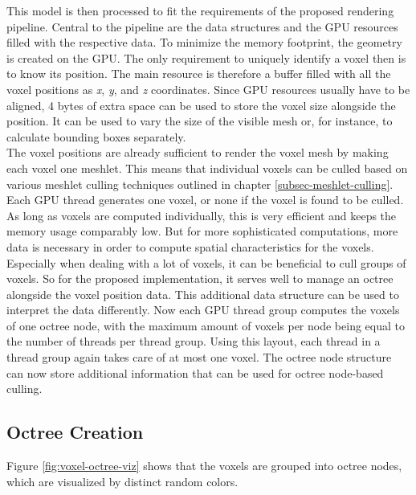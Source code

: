\noindent
This model is then processed to fit the requirements of the proposed rendering pipeline. Central to the pipeline 
are the data structures and the \ac{GPU} resources filled with the respective data. To minimize the memory footprint,
the geometry is created on the \ac{GPU}. The only requirement to uniquely identify a voxel then is to know its position.
The main resource is therefore a buffer filled with all the voxel positions as \emph{x}, \emph{y}, and \emph{z} coordinates. 
Since \ac{GPU} resources usually have to be aligned, 4 bytes of extra space can be used to store the voxel size 
alongside the position. It can be used to vary the size of the visible mesh or, for instance, to calculate bounding 
boxes separately. \\

\noindent
The voxel positions are already sufficient to render the voxel mesh by making each voxel one meshlet. This means that 
individual voxels can be culled based on various meshlet culling techniques outlined in chapter 
\ref{subsec-meshlet-culling}. Each \ac{GPU} thread generates one voxel, or none if the voxel is found to be culled. 
As long as voxels are computed individually, this is very efficient and keeps the memory usage comparably low. But for 
more sophisticated computations, more data is necessary in order to compute spatial characteristics for the voxels. \\

\noindent
Especially when dealing with a lot of voxels, it can be beneficial to cull groups of voxels. So for the proposed 
implementation, it serves well to manage an octree alongside the voxel position data. This additional data structure 
can be used to interpret the data differently. Now each \ac{GPU} thread group computes the voxels of one octree node, 
with the maximum amount of voxels per node being equal to the number of threads per thread group. Using this layout, 
each thread in a thread group again takes care of at most one voxel. The octree node structure can now store additional 
information that can be used for octree node-based culling.

\subsection*{Octree Creation} \label{subsec-octree-creation}

\noindent
Figure \ref{fig:voxel-octree-viz} shows that the voxels are grouped into octree nodes, which are visualized by distinct 
random colors. \\

